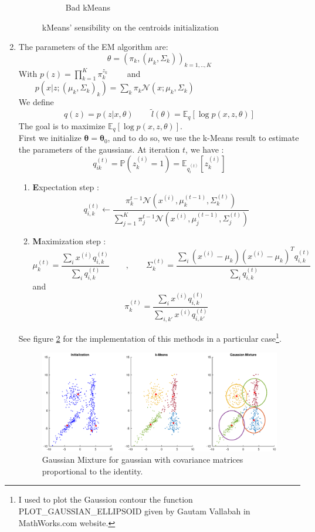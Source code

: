 \documentclass[a4paper,10pt]{article}
\begin{document}
\begin{enumerate}[label=(\alph*)]
\begin{figure}[h!]
\begin{subfigure}[t]{0.5\textwidth}
        \caption{Bad kMeans}
    \end{subfigure}
    \caption{kMeans' sensibility on the centroids initialization} 
    \label{Fig=kMeans}
\end{figure}

\item The parameters of the EM algorithm are: 
\[ 
 \theta   = ( \pi_k , ( \mu_k , \Sigma_k ) )_{k=1,..,K}
\]
With $ p (z) = \prod_{k=1}^K \pi_k^{z_k} \qquad$ and $\qquad p(x|z;( \mu_k , \Sigma_k )_k) = \sum_k \pi_k \mathcal{N}(x ;  \mu_k , \Sigma_k )  $ \\
\newline
We define 
\[ 
q(z) = p(z | x, \theta) \quad \, \quad \tilde{l}(\theta) = \mathbb{E}_q [\log p(x,z,\theta) ] 
\]
The goal is to maximize $  \mathbb{E}_q [\log p(x,z,\theta) ]  $. \\
First we initialize $ \mathbf{ \theta} = \mathbf{ \theta}_0$, and to do so, we use the k-Means result to estimate the parameters of the gaussians. 
At iteration $t$, we have : 
\[
q_{ik}^{(t)} = \mathbb{P}( z^{(i)}_k =1 ) = \mathbb{E}_{q_i^{(t)}} \left[z_k^{(i)} \right]
\]

\begin{enumerate}[label=\textbf{\arabic*-} ] 
\item \textbf{E}xpectation step : 
\[
q_{i,k}^{(t)} \leftarrow \dfrac{\pi_k^{t-1} \mathcal{N}(x^{(i)},\mu_k^{(t-1)},\Sigma_k^{(t)} )  }{ \sum_{j=1}^K \pi_j^{t-1} \mathcal{N}(x^{(i)},\mu_j^{(t-1)},\Sigma_j^{(t)} ) } 
\]
\item \textbf{M}aximization step : 
\[ 
\mu_k^{(t)} = \dfrac{\sum_i x^{(i)} q_{i,k}^{(t)} }{\sum_i q_{i,k}^{(t)} } \qquad , \qquad \Sigma_k^{(t)} = \dfrac{\sum_i (x^{(i)} - \mu_k )  (x^{(i)} - \mu_k )^T q_{i,k}^{(t)}  }{\sum_i q_{i,k}^{(t)}}
\]
and
\[
\pi_k^{(t)} = \dfrac{\sum_{i} x^{(i)} q_{i,k}^{(t)}}{\sum_{i,k'}  x^{(i)} q_{i,k'}^{(t)}}
\]
\end{enumerate} 

See figure \ref{Fig:CirGM} for the implementation of this methods in a particular case\footnote{I used to plot the Gaussion contour the function PLOT\_GAUSSIAN\_ELLIPSOID given by Gautam Vallabah in MathWorks.com website. }.

\begin{figure}[!h]
\includegraphics[width=\linewidth]{classification_data_HWK2/circleGM.eps} 
\caption{Gaussian Mixture for gaussian with covariance matrices proportional to the identity.}
\label{Fig:CirGM}
\end{figure}


\end{enumerate}
\end{document}
